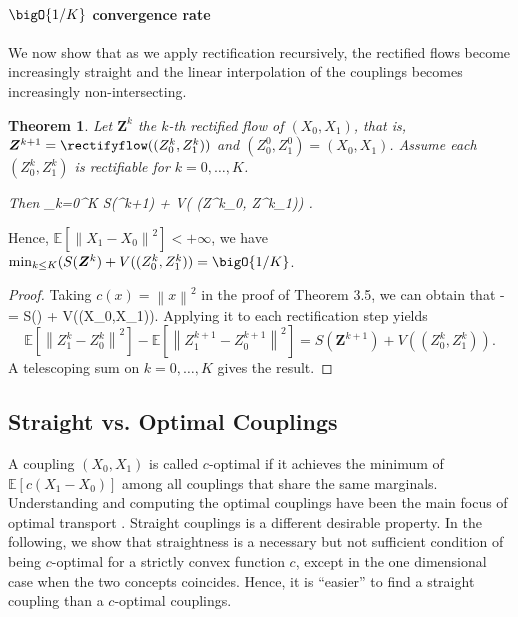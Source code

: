 \documentclass[11pt]{article}
\newtheorem{thm}{Theorem}[section]
\newcommand{\E}{\mathbb{E}}
\newcommand{\vv}[1]{\boldsymbol{#1}}
\newcommand{\norm}[1]{\left\|#1\right\|}
\def\bb#1\ee{\begin{align*}#1\end{align*}}
\begin{document}
\paragraph{$\bigO{1/K}$ convergence rate}  
We now show that as we apply rectification recursively, 
the rectified flows become increasingly straight and the linear interpolation of the couplings becomes increasingly 
non-intersecting. 
\begin{thm} \label{thm:convergence} 
 Let $\vv Z^k$ the $k$-th rectified flow    
 of $(X_0,X_1)$, 
that is, $\vv Z^{k+1} = \rectifyflow((Z_0^k, Z_1^k))$ and $(Z_0^0,Z_1^0) = (X_0,X_1)$. 
Assume each $(Z_0^k,Z_1^k)$ is rectifiable for $k=0,\ldots, K$.  

Then %
\bb 
\sum_{k=0}^K 
S(\vv Z^{k+1}) + V( (Z^k_0, Z^k_1))
\leq  \e{\norm{X_1-X_0}^2}.
\ee 
 \end{thm}
 Hence, $\E[\norm{X_1-X_0}^2]<+\infty$,  we have 
 $\min_{k\leq K} (S(\vv Z^k) + V((Z_0^k,Z_1^k)) = \bigO{1/K}$. 
 
 
\begin{proof}
Taking  $c(x) = \norm{x}^2$ in 
the proof of Theorem 3.5, we can obtain that 
\bbb  \label{diff}
\e{\norm{X_1-X_0}} - \e{\norm{Z_1-Z_0}} = S(\vv Z) + V((X_0,X_1)).
\eee  
Applying it to each rectification step yields
$$
\E\left [\norm{Z^k_1-Z^k_0}^2\right ] - \E\left [\norm{Z^{k+1}_1-Z^{k+1}_0}^2\right ] = S(\vv Z^{k+1}) + V((Z_0^k,Z_1^k)). 
$$
A telescoping sum on $k=0,\ldots, K$ gives the result. 

\end{proof}


\subsection{Straight vs. Optimal Couplings} 
\label{sec:stcouplings}

A coupling $(X_0,X_1)$ is called $c$-optimal if it achieves the minimum of $\E[c(X_1-X_0)]$ among all couplings that share the same marginals.   
Understanding and computing the optimal couplings 
have been the main focus of optimal transport \cite[e.g.,][]{villani2009optimal,ambrosio2021lectures, figalli2021invitation, peyre2019computational}. 
Straight couplings is a different desirable property. %
In the following, 
we show that straightness is a necessary but not sufficient condition of being $c$-optimal for a strictly convex function $c$, except in the one dimensional case when the two concepts coincides. 
Hence, it is ``easier'' to find a straight coupling than a $c$-optimal couplings. 
\end{document}
